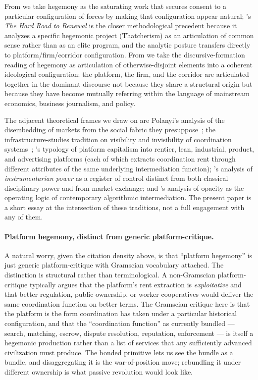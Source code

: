 \documentclass[11pt,a4paper]{article}
\theoremstyle{remark}
\begin{document}
From \citet{hall1986gramsci, hall1988hardroad} we take hegemony as
the saturating work that secures consent to a particular
configuration of forces by making that configuration appear
natural; \citeauthor{hall1988hardroad}'s \emph{The Hard Road to
Renewal} is the closer methodological precedent because it
analyzes a specific hegemonic project (Thatcherism) as an
articulation of common sense rather than as an elite program, and
the analytic posture transfers directly to platform/firm/corridor
configuration. From \citet{laclau_mouffe_1985} we take the
discursive-formation reading of hegemony as articulation of
otherwise-disjoint elements into a coherent ideological
configuration: the platform, the firm, and the corridor are
articulated together in the dominant discourse not because they
share a structural origin but because they have become mutually
referring within the language of mainstream economics, business
journalism, and policy.

The adjacent theoretical frames we draw on are Polanyi's analysis
of the disembedding of markets from the social fabric they
presuppose~\citep{polanyi1944}; the infrastructure-studies
tradition on visibility and invisibility of coordination
systems~\citep{bowker_star_1999, star1999ethnography};
\citet{srnicek2017platform}'s typology of platform capitalism
into rentier, lean, industrial, product, and advertising
platforms (each of which extracts coordination rent through
different attributes of the same underlying intermediation
function); \citet{zuboff2019surveillance}'s analysis of
\emph{instrumentarian power} as a register of control distinct
from both classical disciplinary power and from market exchange;
and \citet{pasquale2015blackbox}'s analysis of opacity as the
operating logic of contemporary algorithmic intermediation. The
present paper is a short essay at the intersection of these
traditions, not a full engagement with any of them.

\paragraph{Platform hegemony, distinct from generic platform-critique.}
A natural worry, given the citation density above, is that
``platform hegemony'' is just generic platform-critique with
Gramscian vocabulary attached. The distinction is structural
rather than terminological. A non-Gramscian platform-critique
typically argues that the platform's rent extraction is
\emph{exploitative} and that better regulation, public ownership,
or worker cooperatives would deliver the same coordination
function on better terms. The Gramscian critique here is that
the platform is the form coordination has taken under a
particular historical configuration, and that the ``coordination
function'' as currently bundled --- search, matching, escrow,
dispute resolution, reputation, enforcement --- is itself a
hegemonic production rather than a list of services that any
sufficiently advanced civilization must produce. The bonded
primitive lets us see the bundle as a bundle, and disaggregating
it is the war-of-position move; rebundling it under different
ownership is what passive revolution would look like.
\end{document}
